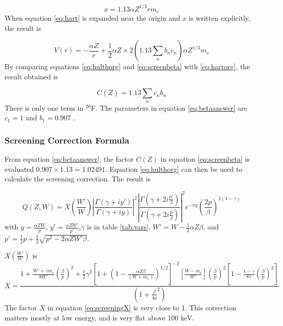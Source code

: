 \documentclass[../MaxHughesThesis.tex]{subfiles}
\begin{document}
\begin{equation}
	x = 1.13 \alpha Z^{1/3} r m_{e}
	\label{eq:screeningx}
\end{equation}
When equation \ref{eq:hart} is expanded near the origin and $x$ is written explicitly, the result is %

\begin{equation}
	V(r) = - \frac{\alpha Z}{r} + \frac{1}{2} \alpha Z \times 2 (1.13 \sum_{n} b_{n} c_{n}) \alpha Z^{1/3} m_{e} 
	\label{eq:hartorg}
\end{equation}
By comparing equations \ref{eq:hulthorg} and \ref{eq:screenbeta} with \ref{eq:hartorg}, the result obtained is %

\begin{equation}
	C(Z) = 1.13 \sum_{n} c_{n} b_{n}
	\label{eq:betaanswer}
\end{equation} 
There is only one term in $^{20}$F. 
The parameters in equation \ref{eq:betaanswer} are $c_{1} = 1$ and $b_{1} = 0.907$ \cite{Bya56}.

\subsubsection{Screening Correction Formula}
From equation \ref{eq:betaanswer}, the factor $C(Z)$ in equation \ref{eq:screenbeta} is evaluated $0.907 \times 1.13 = 1.02491$.
Equation \ref{eq:hulthorg} can then be used to calculate the screening correction.
The result is \cite{Buh84} %

\begin{equation}
	Q(Z,W) = X(\frac{W'}{W}) \left|\frac{\Gamma(\gamma + i y')}{\Gamma(\gamma+ i y)}\right|^{2} \left|\frac{\Gamma(\gamma + 2 i \frac{p'}{\beta})}{\Gamma(\gamma + 2 i \frac{p}{\beta})}\right|^{2}e^{-\pi y}(\frac{2p}{\beta})^{2(1 - \gamma)}
	\label{eq:screeningQ}
\end{equation}
with $y = \frac{\alpha Z W}{p}$, $y' = \frac{\alpha Z W'}{p'}$,$ \gamma$ is in table \ref{tab:vars}, $W' = W - \frac{1}{2}\alpha Z \beta$, and $p' = \frac{1}{2}p + \frac{1}{2}\sqrt{p^{2} - 2 \alpha Z W' \beta}$.

$X(\frac{W'}{W})$ is %
\begin{equation}
	X = \frac{1 + \frac{W' + \gamma m_{e}}{8 W'} (\frac{\beta}{p})^{2} + \frac{1}{2}\gamma^{2}[1 + (1 - \frac{\alpha Z \beta}{(W + m_{e})})^{1/2}]^{-2} [\frac{W - m_{e}}{W'}] (\frac{\beta}{p})^{2}[1 - \frac{1 - \gamma}{8\gamma}(\frac{\beta}{p})^{2}]}{(1 + \frac{\beta}{4p}^{2})}
	\label{eq:screeningX}
\end{equation}
The factor $X$ in equation \ref{eq:screeningX} is very close to 1.
This correction matters mostly at low energy, and is very flat above 100 keV.
\end{document}
